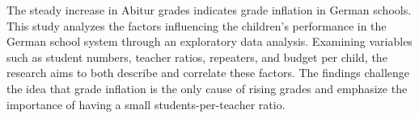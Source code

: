 

The steady increase in Abitur grades indicates grade inflation in German schools. This study analyzes the factors influencing the children's performance in the German school system through an exploratory data analysis. Examining variables such as student numbers, teacher ratios, repeaters, and budget per child, the research aims to both describe and correlate these factors. The findings challenge the idea that grade inflation is the only cause of rising grades and emphasize the importance of having a small students-per-teacher ratio.